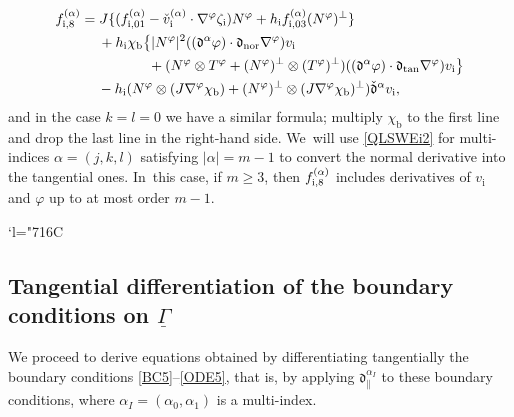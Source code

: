 \documentclass[JEP,XML,SOM,Unicode,NoFloatCountersInSection,published]{cedram}
\newcommand{\Changelback}{\mathcode`l="716C}
\newcommand{\dtan}{{\mathfrak d}_\mathrm{tan}}
\newcommand{\dnor}{{\mathfrak d}_\mathrm{nor}}
\newcommand{\dpar}{{\mathfrak d}_{\parallel}}
\newcommand{\ul}[1]{\underline{#1}}
\newcommand{\itGamma}{\mathit{\Gamma}}
\newcommand{\cmfalpha}{\check{\mathfrak{d}}^{\alpha}}
\theoremstyle{definition}
\begin{document}
\begin{align*}
f_{{\rm i},8}^{(\alpha)}
&= J \{ (f_{{\rm i}, 01}^{(\alpha)} - \check{v}_\mathrm{i}^{(\alpha)}\cdot\nabla^\varphi\zeta_\mathrm{i})N^\varphi
+ h_\mathrm{i}f_{{\rm i},03}^{(\alpha)}(N^\varphi)^\perp \} \\
&\quad\;
+ h_\mathrm{i}\chi_\mathrm{b} \big\{ |N^\varphi|^2((\mathfrak{d}^\alpha\varphi)\cdot\dnor\nabla^\varphi)v_\mathrm{i} \\
&\hspace{1.7cm} + (N^\varphi\otimes T^\varphi + (N^\varphi)^\perp\otimes(T^\varphi)^\perp)((\mathfrak{d}^\alpha\varphi)\cdot\dtan\nabla^\varphi)v_\mathrm{i} \big\} \\
&\quad\:
- h_\mathrm{i}(N^\varphi\otimes(J\nabla^\varphi\chi_\mathrm{b}) + (N^\varphi)^\perp\otimes(J\nabla^\varphi\chi_\mathrm{b})^\perp) \cmfalpha v_\mathrm{i},
\end{align*}
and in the case $k=l=0$ we have a similar formula; multiply $\chi_\mathrm{b}$ to the first line and drop the last line in the right-hand side. We~will use \eqref{QLSWEi2} for multi-indices $\alpha=(j,k,l)$ satisfying $|\alpha|=m-1$ to convert the normal derivative into the tangential ones. In~this case, if $m\geq3$, then $f_{{\rm i},8}^{(\alpha)}$ includes derivatives of $v_\mathrm{i}$ and $\varphi$ up to at most order $m-1$.

\Changelback

\subsection{Tangential differentiation of the boundary conditions on $\ul{\itGamma}$}\label{secttangdiff}
We proceed to derive equations obtained by differentiating tangentially the boundary conditions \eqref{BC5}--\eqref{ODE5},
that is, by applying $\dpar^{\alpha_I}$ to these boundary conditions, where $\alpha_I=(\alpha_0,\alpha_1)$ is a multi-index.
\end{document}
